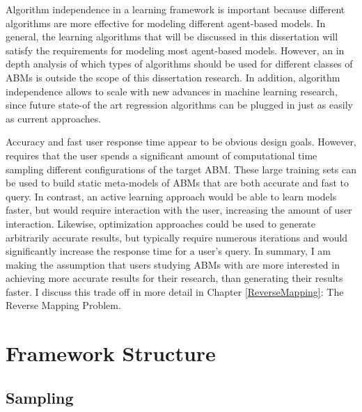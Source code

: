 Algorithm independence in a learning framework is important because different algorithms are more effective for modeling different agent-based models.
In general, the learning algorithms that will be discussed in this dissertation will satisfy the requirements for modeling most agent-based models.
However, an in depth analysis of which types of algorithms should be used for different classes of ABMs is outside the scope of this dissertation research.
In addition, algorithm independence allows \fw to scale with new advances in machine learning research, since future state-of the art regression algorithms can be plugged in just as easily as current approaches.

Accuracy and fast user response time appear to be obvious design goals.
However, \fw requires that the user spends a significant amount of computational time sampling different configurations of the target ABM.
These large training sets can be used to build static meta-models of ABMs that are both accurate and fast to query.
In contrast, an active learning approach would be able to learn models faster, but would require interaction with the user, increasing the amount of user interaction.
Likewise, optimization approaches could be used to generate arbitrarily accurate results, but typically require numerous iterations and would significantly increase the response time for a user's query.
In summary, I am making the assumption that users studying ABMs with \fw are more interested in achieving more accurate results for their research, than generating their results faster.
I discuss this trade off in more detail in Chapter \ref{ReverseMapping}: The Reverse Mapping Problem.



\section{Framework Structure}



\subsection{Sampling}

